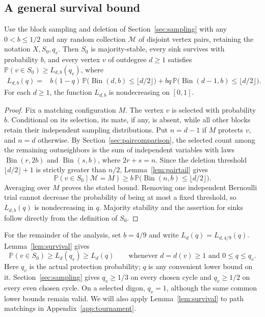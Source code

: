 \documentclass[10pt,a4paper]{article}
\DeclareMathOperator{\Bin}{Bin}
\newcommand{\Pp}{\mathbb P}
\newcommand{\floor}[1]{\lfloor #1\rfloor}
\begin{document}
\subsection{A general survival bound}\label{sec:selectedvertex}
\begin{lemma}\label{lem:survival}
Use the block sampling and deletion of Section~\ref{sec:sampling}
with any $0<b\le1/2$ and any random collection $\mathcal M$ of
disjoint vertex pairs, retaining the notation $X,S_0,q_v$.
Then $S_0$ is majority-stable, every sink survives with probability
$b$, and every vertex $v$ of outdegree $d\ge1$ satisfies
$\Pp(v\in S_0)\ge L_{d,b}(q_v)$, where
\begin{equation}\label{eq:Ldq}
\begin{aligned}
L_{d,b}(q)={}&b(1-q)\,\Pp\bigl(\Bin(d,b)\le\floor{d/2}\bigr)+bq\,\Pp\bigl(\Bin(d-1,b)\le\floor{d/2}\bigr).
\end{aligned}
\end{equation}
For each $d\ge1$, the function $L_{d,b}$ is nondecreasing on $[0,1]$.
\end{lemma}
\begin{proof}
Fix a matching configuration \(M\). The vertex \(v\) is selected with probability \(b\). Conditional on its selection, its mate, if any, is absent, while all other blocks retain their independent sampling distributions. Put \(n=d-1\) if \(M\) protects \(v\), and \(n=d\) otherwise. By Section~\ref{sec:paircomparison}, the selected count among the remaining outneighbors is the sum of independent variables with laws \(\Bin(r,2b)\) and \(\Bin(s,b)\), where \(2r+s=n\). Since the deletion threshold \(\floor{d/2}+1\) is strictly greater than \(n/2\), Lemma~\ref{lem:pairtail} gives
\[
\Pp(v\in S_0\mid\mathcal M=M)
\ge b\,\Pp\bigl(\Bin(n,b)\le\floor{d/2}\bigr).
\]
Averaging over \(M\) proves the stated bound. Removing one independent Bernoulli trial cannot decrease the probability of being at most a fixed threshold, so \(L_{d,b}(q)\) is nondecreasing in \(q\). Majority stability and the assertion for sinks follow directly from the definition of \(S_0\).
\end{proof}

For the remainder of the analysis, set \(b=4/9\) and write \(L_d(q)=L_{d,4/9}(q)\). Lemma~\ref{lem:survival} gives
\[
\Pp(v\in S_0)\ge L_d(q_v)\ge L_d(q)
\qquad\text{whenever }d=d(v)\ge1\text{ and }0\le q\le q_v.
\]
Here \(q_v\) is the actual protection probability; \(q\) is any convenient lower bound on it. Section~\ref{sec:sampling} gives \(q_v\ge1/3\) on every chosen cycle and \(q_v\ge1/2\) on every even chosen cycle. On a selected digon, \(q_v=1\), although the same common lower bounds remain valid. We will also apply Lemma~\ref{lem:survival} to path matchings in Appendix~\ref{app:tournament}.
\end{document}
